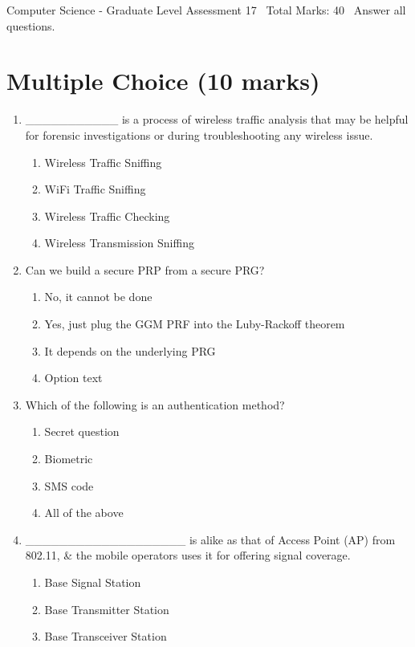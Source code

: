 \documentclass[12pt]{article}
\begin{document}
\begin{center}
Computer Science - Graduate Level Assessment 17 \
Total Marks: 40 \
Answer all questions.
\end{center}

\section*{Multiple Choice (10 marks)}
\begin{enumerate}[label=\arabic*.]
\item \_\_\_\_\_\_\_\_\_\_\_ is a process of wireless traffic analysis that may be helpful for forensic investigations or during troubleshooting any wireless issue.
\begin{enumerate}[label=(\alph*)]
    \item Wireless Traffic Sniffing
    \item WiFi Traffic Sniffing
    \item Wireless Traffic Checking
    \item Wireless Transmission Sniffing
\end{enumerate}
\item Can we build a secure PRP from a secure PRG?
\begin{enumerate}[label=(\alph*)]
    \item No, it cannot be done
    \item Yes, just plug the GGM PRF into the Luby-Rackoff theorem
    \item It depends on the underlying PRG
    \item Option text
\end{enumerate}
\item Which of the following is an authentication method?
\begin{enumerate}[label=(\alph*)]
    \item Secret question
    \item Biometric
    \item SMS code
    \item All of the above
\end{enumerate}
\item \_\_\_\_\_\_\_\_\_\_\_\_\_\_\_\_\_\_\_ is alike as that of Access Point (AP) from 802.11, \& the mobile operators uses it for offering signal coverage.
\begin{enumerate}[label=(\alph*)]
    \item Base Signal Station
    \item Base Transmitter Station
    \item Base Transceiver Station

\end{enumerate}
\end{enumerate}
\end{document}
